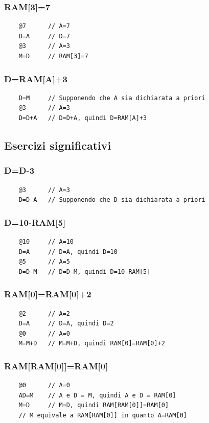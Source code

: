 \documentclass[12pt]{article}
\begin{document}
\subsubsection{RAM[3]=7}
\begin{lstlisting}
    @7      // A=7
    D=A     // D=7
    @3      // A=3
    M=D     // RAM[3]=7
\end{lstlisting}

\subsubsection{D=RAM[A]+3}
\begin{lstlisting}
    D=M     // Supponendo che A sia dichiarata a priori
    @3      // A=3
    D=D+A   // D=D+A, quindi D=RAM[A]+3
\end{lstlisting}

\subsection{Esercizi significativi}

\subsubsection{D=D-3}
\begin{lstlisting}
    @3      // A=3
    D=D-A   // Supponendo che D sia dichiarata a priori
\end{lstlisting}

\subsubsection{D=10-RAM[5]}
\begin{lstlisting}
    @10     // A=10
    D=A     // D=A, quindi D=10
    @5      // A=5
    D=D-M   // D=D-M, quindi D=10-RAM[5]
\end{lstlisting}

\subsubsection{RAM[0]=RAM[0]+2}
\begin{lstlisting}
    @2      // A=2
    D=A     // D=A, quindi D=2
    @0      // A=0
    M=M+D   // M=M+D, quindi RAM[0]=RAM[0]+2
\end{lstlisting}

\subsubsection{RAM[RAM[0]]=RAM[0]}
\begin{lstlisting}
    @0      // A=0
    AD=M    // A e D = M, quindi A e D = RAM[0]
    M=D     // M=D, quindi RAM[RAM[0]]=RAM[0]
    // M equivale a RAM[RAM[0]] in quanto A=RAM[0]
\end{lstlisting}
\end{document}
